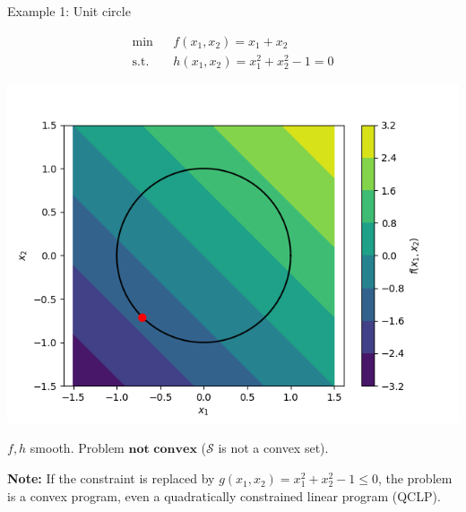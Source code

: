 \begin{vbframe}{Example 1: Unit circle}

\vspace*{-0.5cm} 

\begin{eqnarray*}
  \min && f(x_1, x_2) = x_1 + x_2 \\
  \text{s.t. } && h(x_1,x_2) = x_1^2 + x_2^2 - 1 = 0
\end{eqnarray*}

\begin{center}
  \includegraphics[height=0.3\textwidth, keepaspectratio]{figure_man/unit_circle.png} \\
\end{center}

$f, h$ smooth. Problem $\textbf{not convex}$ ($\mathcal{S}$ is not a convex set). 

\lz 

\begin{footnotesize}
\textbf{Note: } If the constraint is replaced by $g(x_1, x_2) = x_1^2 + x_2^2 - 1 \le 0$, the problem is a convex program, even a quadratically constrained linear program (QCLP). 
\end{footnotesize}

\end{vbframe}


